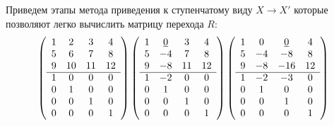 {Приведем этапы метода приведения к ступенчатому виду $X \rightarrow X'$
которые позволяют легко вычислить матрицу перехода $R$:
\[
\left( \begin{array}{cccc}
1 &  2 &  3 &  4 \\
5 &  6 &  7 &  8 \\
9 & 10 & 11 & 12 \\ \cline{1-4}
1 &  0 &  0 &  0 \\
0 &  1 &  0 &  0 \\
0 &  0 &  1 &  0 \\
0 &  0 &  0 &  1
\end{array} \right)
\left( \begin{array}{cccc}
1 &  \underline{0} &  3 &  4 \\
5 & -4 &  7 &  8 \\
9 & -8 & 11 & 12 \\ \cline{1-4}
1 & -2 &  0 &  0 \\
0 &  1 &  0 &  0 \\
0 &  0 &  1 &  0 \\
0 &  0 &  0 &  1
\end{array} \right) 
\left( \begin{array}{cccc}
1 &  0 &   \underline{0} &  4 \\
5 & -4 &  -8 &  8 \\
9 & -8 & -16 & 12 \\ \cline{1-4}
1 & -2 &  -3 &  0 \\
0 &  1 &   0 &  0 \\
0 &  0 &   1 &  0 \\
0 &  0 &   0 &  1
\end{array} \right) \]

}
